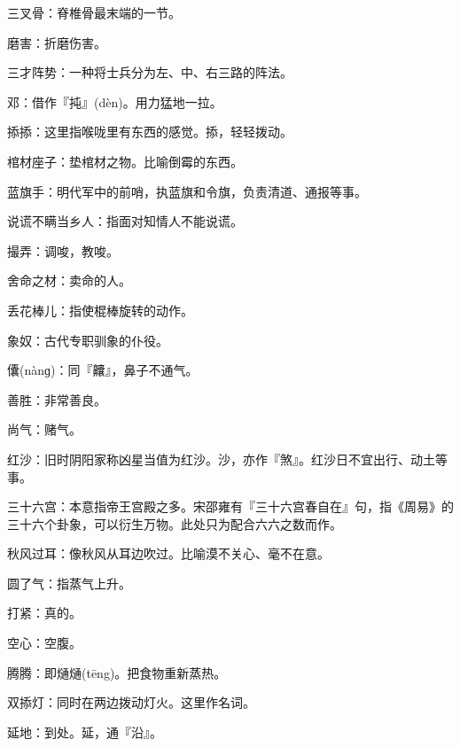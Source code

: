 \startbuffer[2070]
三叉骨：脊椎骨最末端的一节。
\stopbuffer


\startbuffer[2071]
磨害：折磨伤害。
\stopbuffer


\startbuffer[2072]
三才阵势：一种将士兵分为左、中、右三路的阵法。
\stopbuffer


\startbuffer[2073]
邓：借作『扽』(dèn)。用力猛地一拉。
\stopbuffer


\startbuffer[2074]
掭掭：这里指喉咙里有东西的感觉。掭，轻轻拨动。
\stopbuffer


\startbuffer[2075]
棺材座子：垫棺材之物。比喻倒霉的东西。
\stopbuffer


\startbuffer[2076]
蓝旗手：明代军中的前哨，执蓝旗和令旗，负责清道、通报等事。
\stopbuffer


\startbuffer[2077]
说谎不瞒当乡人：指面对知情人不能说谎。
\stopbuffer


\startbuffer[2078]
撮弄：调唆，教唆。
\stopbuffer


\startbuffer[2079]
舍命之材：卖命的人。
\stopbuffer


\startbuffer[2080]
丢花棒儿：指使棍棒旋转的动作。
\stopbuffer


\startbuffer[2081]
象奴：古代专职驯象的仆役。
\stopbuffer


\startbuffer[2082]
儾(nànɡ)：同『齉』，鼻子不通气。
\stopbuffer


\startbuffer[2083]
善胜：非常善良。
\stopbuffer


\startbuffer[2084]
尚气：赌气。
\stopbuffer


\startbuffer[2085]
红沙：旧时阴阳家称凶星当值为红沙。沙，亦作『煞』。红沙日不宜出行、动土等事。
\stopbuffer


\startbuffer[2086]
三十六宫：本意指帝王宫殿之多。宋邵雍有『三十六宫春自在』句，指《周易》的三十六个卦象，可以衍生万物。此处只为配合六六之数而作。
\stopbuffer


\startbuffer[2087]
秋风过耳：像秋风从耳边吹过。比喻漠不关心、毫不在意。
\stopbuffer


\startbuffer[2088]
圆了气：指蒸气上升。
\stopbuffer


\startbuffer[2089]
打紧：真的。
\stopbuffer


\startbuffer[2090]
空心：空腹。
\stopbuffer


\startbuffer[2091]
腾腾：即熥熥(tēng)。把食物重新蒸热。
\stopbuffer


\startbuffer[2092]
双掭灯：同时在两边拨动灯火。这里作名词。
\stopbuffer


\startbuffer[2093]
延地：到处。延，通『沿』。
\stopbuffer


